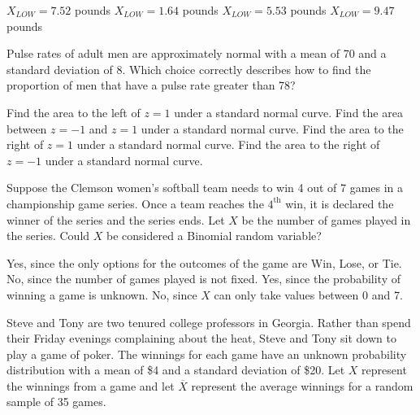\documentclass[noanswers]{exam}
\begin{document}
\begin{questions}
\begin{parts}
\vspace{3mm}

\begin{choices}
\choice $X_{LOW}=7.52$ pounds
\choice $X_{LOW}=1.64$ pounds
\CorrectChoice $X_{LOW}=5.53$ pounds
\choice $X_{LOW}=9.47$ pounds
\end{choices}

\vspace{3mm}

\end{parts}

\question Pulse rates of adult men are approximately normal with a mean of 70 and a standard deviation of 8. Which choice correctly describes how to find the proportion of men that have a pulse rate greater than 78?

\vspace{3mm}

\begin{choices}
\choice Find the area to the left of $z=1$ under a standard normal curve.
\choice Find the area between $z=-1$ and $z=1$ under a standard normal curve.
\CorrectChoice Find the area to the right of $z=1$ under a standard normal curve.
\choice Find the area to the right of $z=-1$ under a standard normal curve.
\end{choices}

\vspace{3mm}

\question Suppose the Clemson women's softball team needs to win 4 out of 7 games in a championship game series. Once a team reaches the $4^\text{th}$ win, it is declared the winner of the series and the series ends. Let $X$ be the number of games played in the series. Could $X$ be considered a Binomial random variable?

\vspace{3mm}

\begin{choices}
\choice Yes, since the only options for the outcomes of the game are Win, Lose, or Tie.
\CorrectChoice No, since the number of games played is not fixed.
\choice Yes, since the probability of winning a game is unknown.
\choice No, since $X$ can only take values between 0 and 7.
\end{choices}

\vspace{3mm} 

\newpage

\question Steve and Tony are two tenured college professors in Georgia. Rather than spend their Friday evenings complaining about the heat, Steve and Tony sit down to play a game of poker. The winnings for each game have an unknown probability distribution with a mean of \$4 and a standard deviation of \$20. Let $X$ represent the winnings from a  game and let $\overline{X}$ represent the average winnings for a random sample of 35 games.


\end{questions}
\end{document}
